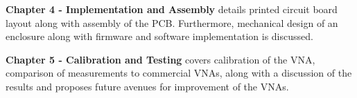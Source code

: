 \textbf{Chapter 4 - Implementation and Assembly} details printed circuit board layout along with assembly of the PCB. Furthermore, mechanical design of an enclosure along with firmware and software implementation is discussed. \par

\textbf{Chapter 5 - Calibration and Testing} covers calibration of the VNA, comparison of measurements to commercial VNAs, along with a discussion of the results and proposes future avenues for improvement of the VNAs. 